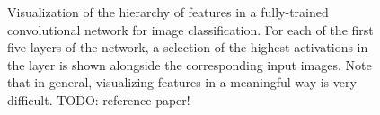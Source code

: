 %


\pagebreak
\thispagestyle{empty}
\begin{figure}
\centering
{}
\begin{minipage}[c]{\textwidth - 2in}
\caption{Visualization of the hierarchy of features in a fully-trained
convolutional network for image classification. For each of the first five
layers of the network, a selection of the highest activations in the layer is
shown alongside the corresponding input images. Note that in general,
visualizing features in a meaningful way is very difficult. TODO: reference
paper!\label{fig:cnn_features}}
\end{minipage}
\end{figure}
\pagebreak
\restoregeometry

